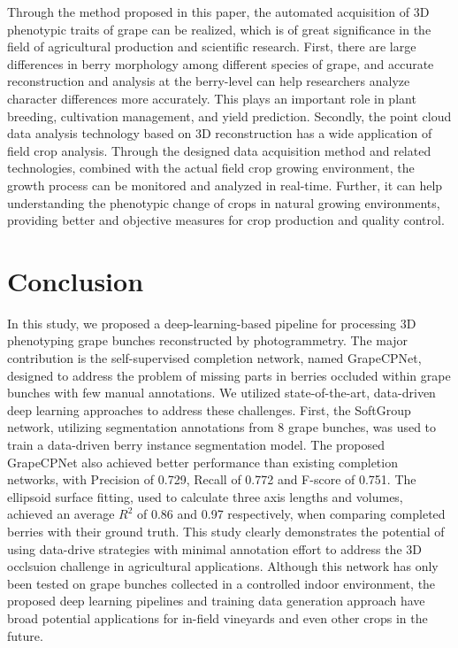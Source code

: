 \documentclass[12pt]{article}
\begin{document}
Through the method proposed in this paper, the automated acquisition of 3D phenotypic traits of grape can be realized, which is of great significance in the field of agricultural production and scientific research. 
First, there are large differences in berry morphology among different species of grape, and accurate reconstruction and analysis at the berry-level can help researchers analyze character differences more accurately. 
This plays an important role in plant breeding, cultivation management, and yield prediction. 
Secondly, the point cloud data analysis technology based on 3D reconstruction has a wide application of field crop analysis. 
Through the designed data acquisition method and related technologies, combined with the actual field crop growing environment, the growth process can be monitored and analyzed in real-time. 
Further, it can help understanding the phenotypic change of crops in natural growing environments, providing better and objective measures for crop production and quality control. 

\section{Conclusion}

In this study, we proposed a deep-learning-based pipeline for processing 3D phenotyping grape bunches reconstructed by photogrammetry.
The major contribution is the self-supervised completion network, named GrapeCPNet, designed to address the problem of missing parts in berries occluded within grape bunches with few manual annotations.
We utilized state-of-the-art, data-driven deep learning approaches to address these challenges.
First, the SoftGroup network, utilizing segmentation annotations from 8 grape bunches, was used to train a data-driven berry instance segmentation model.
The proposed GrapeCPNet also achieved better performance than existing completion networks, with Precision of 0.729, Recall of 0.772 and F-score of 0.751.
The ellipsoid surface fitting, used to calculate three axis lengths and volumes, achieved an average $R^2$ of 0.86 and 0.97 respectively, when comparing completed berries with their ground truth.
This study clearly demonstrates the potential of using data-drive strategies with minimal annotation effort to address the 3D occlsuion challenge in agricultural applications.
Although this network has only been tested on grape bunches collected in a controlled indoor environment, the proposed deep learning pipelines and training data generation approach have broad potential applications for in-field vineyards and even other crops in the future.
\end{document}
